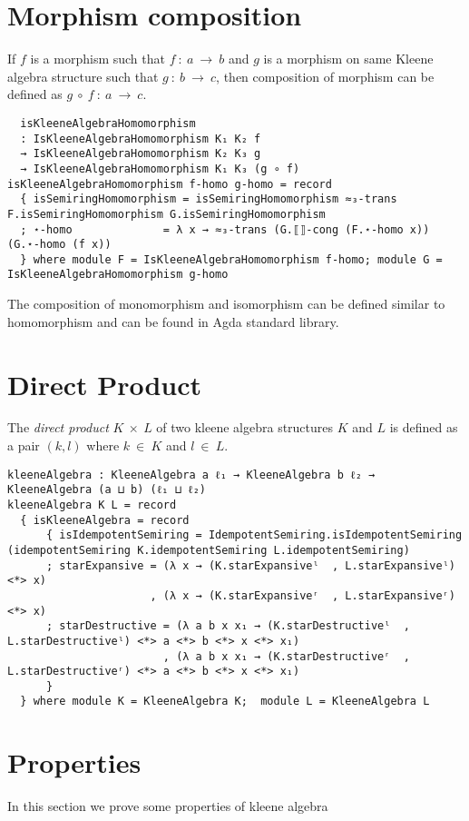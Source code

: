 \section{Morphism composition}
If $f$ is a morphism such that $f\ :\ a \ \rightarrow \ b$ and $g$ is a morphism
on same Kleene algebra structure such that $g\ :\ b\ \rightarrow \ c$, then
composition of morphism can be defined as $g \ ∘\ f\ :\ a \ \rightarrow \ c$.
\begin{verbatim}
  isKleeneAlgebraHomomorphism
  : IsKleeneAlgebraHomomorphism K₁ K₂ f
  → IsKleeneAlgebraHomomorphism K₂ K₃ g
  → IsKleeneAlgebraHomomorphism K₁ K₃ (g ∘ f)
isKleeneAlgebraHomomorphism f-homo g-homo = record
  { isSemiringHomomorphism = isSemiringHomomorphism ≈₃-trans F.isSemiringHomomorphism G.isSemiringHomomorphism
  ; ⋆-homo              = λ x → ≈₃-trans (G.⟦⟧-cong (F.⋆-homo x)) (G.⋆-homo (f x))
  } where module F = IsKleeneAlgebraHomomorphism f-homo; module G = IsKleeneAlgebraHomomorphism g-homo
\end{verbatim}
The composition of monomorphism and isomorphism can be defined similar to
homomorphism and can be found in Agda standard library.

\section{Direct Product}
The \textit{direct product} $K \ \times \ L$ of two kleene algebra structures
$K$ and $L$ is defined as a pair $(k,l)$ where $k \ \in \ K$ and $l \ \in \ L$.
\begin{verbatim}
kleeneAlgebra : KleeneAlgebra a ℓ₁ → KleeneAlgebra b ℓ₂ → KleeneAlgebra (a ⊔ b) (ℓ₁ ⊔ ℓ₂)
kleeneAlgebra K L = record
  { isKleeneAlgebra = record
      { isIdempotentSemiring = IdempotentSemiring.isIdempotentSemiring (idempotentSemiring K.idempotentSemiring L.idempotentSemiring)
      ; starExpansive = (λ x → (K.starExpansiveˡ  , L.starExpansiveˡ) <*> x)
                      , (λ x → (K.starExpansiveʳ  , L.starExpansiveʳ) <*> x)
      ; starDestructive = (λ a b x x₁ → (K.starDestructiveˡ  , L.starDestructiveˡ) <*> a <*> b <*> x <*> x₁)
                        , (λ a b x x₁ → (K.starDestructiveʳ  , L.starDestructiveʳ) <*> a <*> b <*> x <*> x₁)
      }
  } where module K = KleeneAlgebra K;  module L = KleeneAlgebra L
\end{verbatim}

\section{Properties}
In this section we prove some properties of kleene algebra

